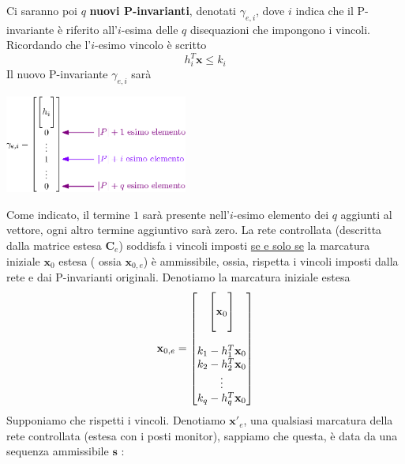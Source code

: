 \documentclass[10pt, letterpaper]{report}
\begin{document}
Ci saranno poi $q$ \textbf{nuovi P-invarianti}, denotati $\gamma_{e,i}$, dove $i$ indica che il P-invariante è riferito all'$i$-esima delle $q$ disequazioni che impongono i vincoli. Ricordando che l'$i$-esimo vincolo è scritto 
$$  h_i^T\mathbf x \le k_i$$
Il nuovo P-invariante $\gamma_{e,i}$ sarà 
\begin{center}
    \includegraphics[width=0.45\textwidth]{images/nuoviPinvarianti.eps}
\end{center}
Come indicato, il termine $1$ sarà presente nell'$i$-esimo elemento dei $q$ aggiunti al vettore, ogni altro termine aggiuntivo sarà zero.\acc 
\teo{} La rete controllata (descritta dalla matrice estesa $\mathbf C_e$) soddisfa i vincoli imposti \underline{se e solo se} la marcatura iniziale $\mathbf x_0$ estesa ( ossia $\mathbf x_{0,e}$) è ammissibile, ossia, rispetta i vincoli imposti dalla rete e dai P-invarianti originali.\acc
\dimo{} Denotiamo la marcatura iniziale estesa 
$$\mathbf x_{0,e}=\begin{bmatrix}
    \begin{bmatrix}
        \\ \mathbf x_0 \\ \hphantom{a}
    \end{bmatrix}\\ \\
    k_1-h_1^T\mathbf x_0\\
    k_2-h_2^T\mathbf x_0\\ \vdots \\ 
    k_q-h_q^T\mathbf x_0
\end{bmatrix} $$
Supponiamo che rispetti i vincoli. Denotiamo $\mathbf x'_e$, una qualsiasi marcatura della rete controllata (estesa con i posti monitor), sappiamo che questa, è data da una sequenza ammissibile $\mathbf{s}$ :
\end{document}
